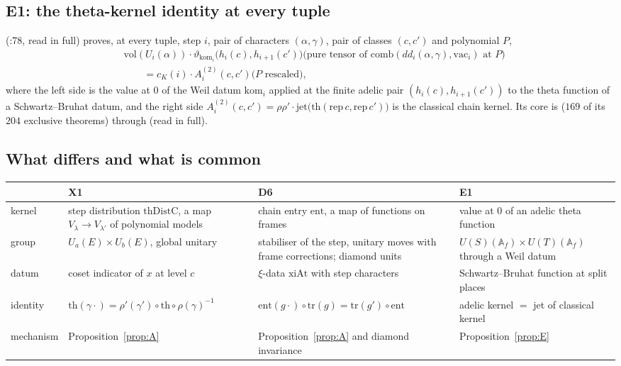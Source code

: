 \documentclass[11pt]{article}
\newcommand{\rr}{\raggedright\arraybackslash}
\theoremstyle{definition}
\theoremstyle{remark}
\begin{document}
\subsection{E1: the theta-kernel identity at every tuple}
 (:78, read in full) proves, at every tuple, step $i$, pair of characters $(\alpha,\gamma)$, pair of classes $(c,c')$ and polynomial $P$,
\[
\begin{aligned}
&\mathrm{vol}(U_i(\alpha))\cdot\vartheta_{\mathrm{kom}_i}\bigl(h_i(c),h_{i+1}(c')\bigr)\bigl(\text{pure tensor of }\mathrm{comb}(dd_i(\alpha,\gamma),\mathrm{vac}_i)\text{ at }P\bigr)\\
&\qquad= c_K(i)\cdot A^{(2)}_i(c,c')\bigl(P\text{ rescaled}\bigr),
\end{aligned}
\]
where the left side is the value at $0$ of the Weil datum $\mathrm{kom}_i$ applied at the finite adelic pair $(h_i(c),h_{i+1}(c'))$ to the theta function of a Schwartz--Bruhat datum, and the right side $A^{(2)}_i(c,c')=\rho\rho'\cdot\mathrm{jet}\bigl(\mathrm{th}(\mathrm{rep}\,c,\mathrm{rep}\,c')\bigr)$ is the classical chain kernel. Its core is  ($169$ of its $204$ exclusive theorems) through  (read in full).

\subsection{What differs and what is common}

\begin{center}\small
\begin{tabular}{>{\rr}p{2.6cm}>{\rr}p{4.1cm}>{\rr}p{4.1cm}>{\rr}p{4.1cm}}
\toprule
& X1 & D6 & E1\\
\midrule
kernel & step distribution $\mathrm{thDistC}$, a map $V_\lambda\to V_{\lambda'}$ of polynomial models & chain entry $\mathrm{ent}$, a map of functions on frames & value at $0$ of an adelic theta function\\
group & $U_a(E)\times U_b(E)$, global unitary & stabiliser of the step, unitary moves with frame corrections; diamond units & $U(S)(\mathbb A_f)\times U(T)(\mathbb A_f)$ through a Weil datum\\
datum & coset indicator of $x$ at level $c$ & $\xi$-data $\mathrm{xiAt}$ with step characters & Schwartz--Bruhat function at split places\\
identity & $\mathrm{th}(\gamma\cdot)=\rho'(\gamma')\circ\mathrm{th}\circ\rho(\gamma)^{-1}$ & $\mathrm{ent}(g\cdot)\circ\mathrm{tr}(g)=\mathrm{tr}(g')\circ\mathrm{ent}$ & adelic kernel $=$ jet of classical kernel\\
mechanism & Proposition~\ref{prop:A} & Proposition~\ref{prop:A} and diamond invariance & Proposition~\ref{prop:E}\\
\bottomrule
\end{tabular}
\end{center}
\end{document}
